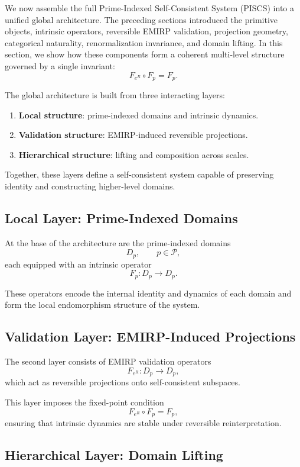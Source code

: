\documentclass[11pt]{article}
\theoremstyle{definition}
\theoremstyle{plain}
\theoremstyle{remark}
\begin{document}
We now assemble the full Prime-Indexed Self-Consistent System (PISCS)
into a unified global architecture. The preceding sections introduced the
primitive objects, intrinsic operators, reversible EMIRP validation,
projection geometry, categorical naturality, renormalization invariance,
and domain lifting. In this section, we show how these components form a
coherent multi-level structure governed by a single invariant:
\[
F_{e^R} \circ F_p = F_p.
\]

The global architecture is built from three interacting layers:
\begin{enumerate}
    \item \textbf{Local structure}: prime-indexed domains and intrinsic dynamics.
    \item \textbf{Validation structure}: EMIRP-induced reversible projections.
    \item \textbf{Hierarchical structure}: lifting and composition across scales.
\end{enumerate}

Together, these layers define a self-consistent system capable of
preserving identity and constructing higher-level domains.

\subsection{Local Layer: Prime-Indexed Domains}

At the base of the architecture are the prime-indexed domains
\[
D_p, \qquad p \in \mathcal{P},
\]
each equipped with an intrinsic operator
\[
F_p : D_p \to D_p.
\]

These operators encode the internal identity and dynamics of each domain
and form the local endomorphism structure of the system.

\subsection{Validation Layer: EMIRP-Induced Projections}

The second layer consists of EMIRP validation operators
\[
F_{e^R} : D_p \to D_p,
\]
which act as reversible projections onto self-consistent subspaces.

This layer imposes the fixed-point condition
\[
F_{e^R} \circ F_p = F_p,
\]
ensuring that intrinsic dynamics are stable under reversible
reinterpretation.

\subsection{Hierarchical Layer: Domain Lifting}
\end{document}

